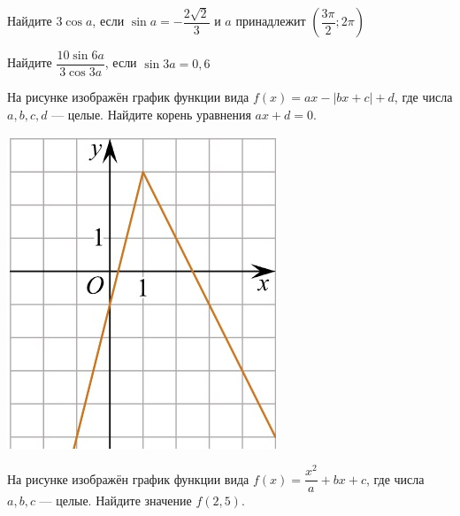\begin{homework}[number=3]
\begin{listofex}
		\item Найдите \( 3\cos{a} \), если \( \sin{a}= - \dfrac{2\sqrt{2}}{3} \) и \(a\) принадлежит \( \left( \dfrac{3\pi}{2}; 2\pi \right) \)
		\item Найдите \( \dfrac{10\sin{6a}}{3\cos{3a}} \), если \( \sin{3a}=0,6 \)
		\item
		\begin{minipage}[t]{0.3\textwidth}
			На рисунке изображён график функции вида \(f(x)=ax-|bx+c|+d\), где числа \(a, b, c, d\) --- целые. Найдите корень уравнения \(ax+d=0\).
		\end{minipage}
		\begin{minipage}[c]{0.1\textwidth}
			\includegraphics[align=t, width=\textwidth]{../../pics/G111M4C5-3.jpg}
		\end{minipage}
		\item 
		\begin{minipage}[t]{0.3\textwidth}
			На рисунке изображён график функции вида \(f(x)=\dfrac{x^2}{a}+bx+c\), где числа \(a, b, c\) --- целые. Найдите значение \(f(2,5)\).
		\end{minipage}
		\begin{minipage}[c]{0.12\textwidth}

\end{minipage}
\end{listofex}
\end{homework}
